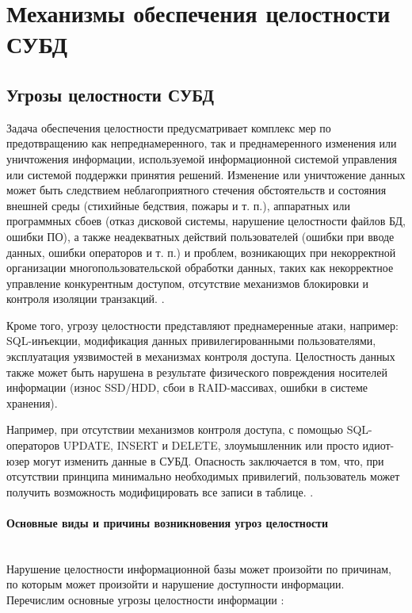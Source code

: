 \section{Механизмы обеспечения целостности СУБД}

\subsection{Угрозы целостности СУБД}
Задача обеспечения целостности предусматривает комплекс мер по предотвращению как непреднамеренного, так и преднамеренного изменения или уничтожения информации, используемой информационной системой управления или системой поддержки принятия решений. Изменение или уничтожение данных может быть следствием неблагоприятного стечения обстоятельств и состояния внешней среды (стихийные бедствия, пожары и т. п.), аппаратных или программных сбоев (отказ дисковой системы, нарушение целостности файлов БД, ошибки ПО), а также неадекватных действий пользователей (ошибки при вводе данных, ошибки операторов и т. п.) и проблем, возникающих при некорректной организации многопользовательской обработки данных, таких как некорректное управление конкурентным доступом, отсутствие механизмов блокировки и контроля изоляции транзакций. \autocite{Lihonosov2011}.

Кроме того, угрозу целостности представляют преднамеренные атаки, например: SQL-инъекции, модификация данных привилегированными пользователями, эксплуатация уязвимостей в механизмах контроля доступа. Целостность данных также может быть нарушена в результате физического повреждения носителей информации (износ SSD/HDD, сбои в RAID-массивах, ошибки в системе хранения).

Например, при отсутствии механизмов контроля доступа, с помощью SQL-операторов UPDATE, INSERT и DELETE, злоумышленник или просто идиот-юзер могут изменить данные в СУБД. Опасность заключается в том, что, при отсутствии принципа минимально необходимых привилегий, пользователь может получить возможность модифицировать все записи в таблице.  \autocite{Utebov2008}.

\paragraph{Основные виды и причины возникновения угроз целостности} ~\\

Нарушение целостности информационной базы может произойти по причинам, по которым может произойти и нарушение доступности информации.
Перечислим основные угрозы целостности информации \autocite{Pirogov2009}:

